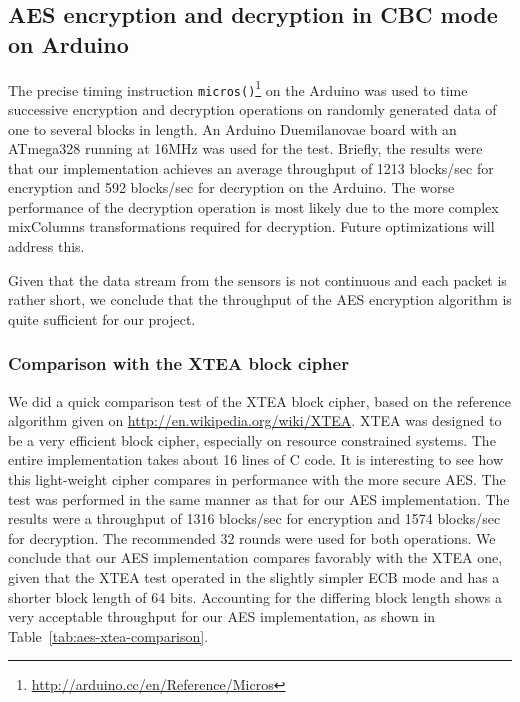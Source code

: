 \subsection{AES encryption and decryption in CBC mode on Arduino}
\label{sec:aes-cbc-performance-arduino}

The precise timing instruction \texttt{micros()}\footnote{\url{http://arduino.cc/en/Reference/Micros}} on the Arduino was used to time successive encryption and decryption operations on randomly generated data of one to several blocks in length. An Arduino Duemilanovae board with an ATmega328 running at 16MHz was used for the test. Briefly, the results were that our implementation achieves an average throughput of 1213 blocks/sec for encryption and 592 blocks/sec for decryption on the Arduino. The worse performance of the decryption operation is most likely due to the more complex mixColumns transformations required for decryption. Future optimizations will address this.

Given that the data stream from the sensors is not continuous and each packet is rather short, we conclude that the throughput of the AES encryption algorithm is quite sufficient for our project.

\subsubsection*{Comparison with the XTEA block cipher}

We did a quick comparison test of the XTEA  block cipher, based on the reference algorithm given on \url{http://en.wikipedia.org/wiki/XTEA}. XTEA was designed to be a very efficient block cipher, especially on resource constrained systems. The entire implementation takes about 16 lines of C code. It is interesting to see how this light-weight cipher compares in performance with the more secure AES. The test was performed in the same manner as that for our AES implementation. The results were a throughput of 1316 blocks/sec for encryption and 1574 blocks/sec for decryption. The recommended 32 rounds were used for both operations. We conclude that our AES implementation compares favorably with the XTEA one, given that the XTEA test operated in the slightly simpler ECB mode and has a shorter block length of 64 bits. Accounting for the differing block length shows a very acceptable throughput for our AES implementation, as shown in Table~\ref{tab:aes-xtea-comparison}.


